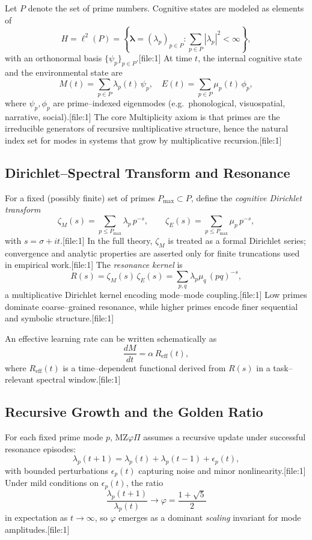 \documentclass[11pt]{article}
\begin{document}
Let $P$ denote the set of prime numbers.
Cognitive states are modeled as elements of
\[
H = \ell^{2}(P) = \left\{ \bm{\lambda} = (\lambda_{p})_{p \in P} : \sum_{p \in P} |\lambda_{p}|^{2} < \infty \right\},
\]
with an orthonormal basis $\{\psi_{p}\}_{p \in P}$.[file:1]
At time $t$, the internal cognitive state and the environmental state are
\[
M(t) = \sum_{p \in P} \lambda_{p}(t)\,\psi_{p},\quad
E(t) = \sum_{p \in P} \mu_{p}(t)\,\phi_{p},
\]
where $\psi_{p},\phi_{p}$ are prime--indexed eigenmodes (e.g.\ phonological, visuospatial, narrative, social).[file:1]
The core Multiplicity axiom is that primes are the irreducible generators of recursive multiplicative structure, hence the natural index set for modes in systems that grow by multiplicative recursion.[file:1]

\subsection{Dirichlet--Spectral Transform and Resonance}

For a fixed (possibly finite) set of primes $P_{\max} \subset P$, define the \emph{cognitive Dirichlet transform}
\[
\zeta_{M}(s)
  = \sum_{p \leq P_{\max}} \lambda_{p}\,p^{-s},\qquad
\zeta_{E}(s)
  = \sum_{p \leq P_{\max}} \mu_{p}\,p^{-s},
\]
with $s = \sigma + i t$.[file:1]
In the full theory, $\zeta_{M}$ is treated as a formal Dirichlet series; convergence and analytic properties are asserted only for finite truncations used in empirical work.[file:1]
The \emph{resonance kernel} is
\[
R(s) = \zeta_{M}(s)\,\zeta_{E}(s)
      = \sum_{p,q} \lambda_{p}\mu_{q}\,(pq)^{-s},
\]
a multiplicative Dirichlet kernel encoding mode--mode coupling.[file:1]
Low primes dominate coarse--grained resonance, while higher primes encode finer sequential and symbolic structure.[file:1]

An effective learning rate can be written schematically as
\[
\frac{d M}{dt} = \alpha\,R_{\mathrm{eff}}(t),
\]
where $R_{\mathrm{eff}}(t)$ is a time--dependent functional derived from $R(s)$ in a task--relevant spectral window.[file:1]

\subsection{Recursive Growth and the Golden Ratio}

For each fixed prime mode $p$, MZ$\varphi\Pi$ assumes a recursive update under successful resonance episodes:
\begin{equation}
\lambda_{p}(t+1)
  = \lambda_{p}(t) + \lambda_{p}(t-1) + \epsilon_{p}(t),
\label{eq:fib}
\end{equation}
with bounded perturbations $\epsilon_{p}(t)$ capturing noise and minor nonlinearity.[file:1]
Under mild conditions on $\epsilon_{p}(t)$, the ratio
\[
\frac{\lambda_{p}(t+1)}{\lambda_{p}(t)} \to \varphi
  = \frac{1 + \sqrt{5}}{2}
\]
in expectation as $t \to \infty$, so $\varphi$ emerges as a dominant \emph{scaling} invariant for mode amplitudes.[file:1]
\end{document}
